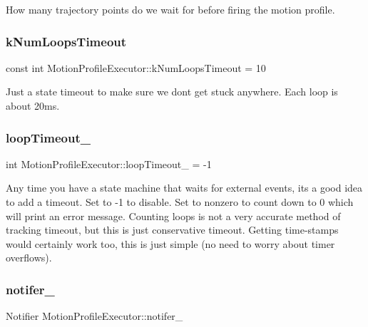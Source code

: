 How many trajectory points do we wait for before firing the motion profile. \mbox{\label{class_motion_profile_executor_a125cf2e048a603624b5d74691a9805ff}} 
\subsubsection{\texorpdfstring{k\+Num\+Loops\+Timeout}{kNumLoopsTimeout}}
{\footnotesize\ttfamily const int Motion\+Profile\+Executor\+::k\+Num\+Loops\+Timeout = 10\hspace{0.3cm}{\ttfamily [static]}}

Just a state timeout to make sure we don\textquotesingle{}t get stuck anywhere. Each loop is about 20ms. \mbox{\label{class_motion_profile_executor_aba6cb888640b9bb7c169e1bf33de92b3}} 
\subsubsection{\texorpdfstring{loop\+Timeout\+\_\+}{loopTimeout\_}}
{\footnotesize\ttfamily int Motion\+Profile\+Executor\+::loop\+Timeout\+\_\+ = -\/1}

Any time you have a state machine that waits for external events, its a good idea to add a timeout. Set to -\/1 to disable. Set to nonzero to count down to \textquotesingle{}0\textquotesingle{} which will print an error message. Counting loops is not a very accurate method of tracking timeout, but this is just conservative timeout. Getting time-\/stamps would certainly work too, this is just simple (no need to worry about timer overflows). \mbox{\label{class_motion_profile_executor_a01ac4918310bd4207fa361ee66124602}} 
\subsubsection{\texorpdfstring{notifer\+\_\+}{notifer\_}}
{\footnotesize\ttfamily Notifier Motion\+Profile\+Executor\+::notifer\+\_\+}

